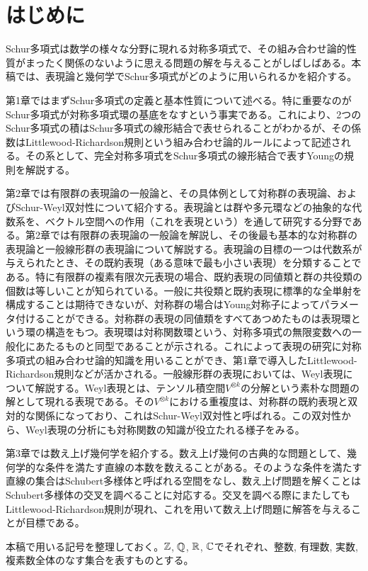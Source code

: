 \chapter*{はじめに}
Schur多項式は数学の様々な分野に現れる対称多項式で、その組み合わせ論的性質がまったく関係のないように思える問題の解を与えることがしばしばある。本稿では、表現論と幾何学でSchur多項式がどのように用いられるかを紹介する。


第1章ではまずSchur多項式の定義と基本性質について述べる。特に重要なのがSchur多項式が対称多項式環の基底をなすという事実である。これにより、2つのSchur多項式の積はSchur多項式の線形結合で表せられることがわかるが、その係数はLittlewood-Richardson規則という組み合わせ論的ルールによって記述される。その系として、完全対称多項式をSchur多項式の線形結合で表すYoungの規則を解説する。


第2章では有限群の表現論の一般論と、その具体例として対称群の表現論、およびSchur-Weyl双対性について紹介する。表現論とは群や多元環などの抽象的な代数系を、ベクトル空間への作用（これを表現という）を通して研究する分野である。第2章では有限群の表現論の一般論を解説し、その後最も基本的な対称群の表現論と一般線形群の表現論について解説する。表現論の目標の一つは代数系が与えられたとき、その既約表現（ある意味で最も小さい表現）を分類することである。特に有限群の複素有限次元表現の場合、既約表現の同値類と群の共役類の個数は等しいことが知られている。一般に共役類と既約表現に標準的な全単射を構成することは期待できないが、対称群の場合はYoung対称子によってパラメータ付けることができる。対称群の表現の同値類をすべてあつめたものは表現環という環の構造をもつ。表現環は対称関数環という、対称多項式の無限変数への一般化にあたるものと同型であることが示される。これによって表現の研究に対称多項式の組み合わせ論的知識を用いることができ、第1章で導入したLittlewood-Richardson規則などが活かされる。一般線形群の表現においては、Weyl表現について解説する。Weyl表現とは、テンソル積空間$V^{\otimes k}$の分解という素朴な問題の解として現れる表現である。その$V^{\otimes k}$における重複度は、対称群の既約表現と双対的な関係になっており、これはSchur-Weyl双対性と呼ばれる。この双対性から、Weyl表現の分析にも対称関数の知識が役立たれる様子をみる。

第3章では数え上げ幾何学を紹介する。数え上げ幾何の古典的な問題として、幾何学的な条件を満たす直線の本数を数えることがある。そのような条件を満たす直線の集合はSchubert多様体と呼ばれる空間をなし、数え上げ問題を解くことはSchubert多様体の交叉を調べることに対応する。交叉を調べる際にまたしてもLittlewood-Richardson規則が現れ、これを用いて数え上げ問題に解答を与えることが目標である。


本稿で用いる記号を整理しておく。$\mathbb{Z}$, $\mathbb{Q}$, $\mathbb{R}$, $\mathbb{C}$でそれぞれ、整数, 有理数, 実数, 複素数全体のなす集合を表すものとする。